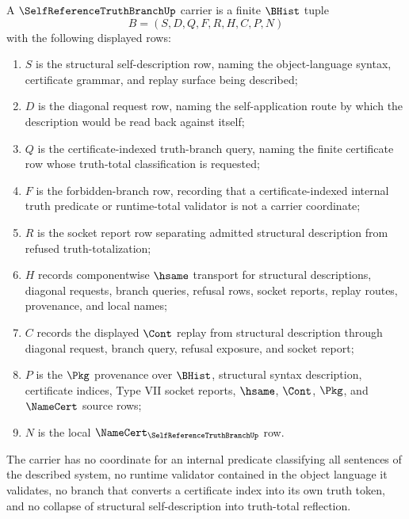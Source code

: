 \begin{definition}
\label{def:self-reference-truth-branch-carrier}
A $\SelfReferenceTruthBranchUp$ carrier is a finite $\BHist$ tuple
$$
B=(S,D,Q,F,R,H,C,P,N)
$$
with the following displayed rows:
\begin{enumerate}
\item $S$ is the structural self-description row, naming the object-language syntax, certificate grammar, and replay surface being described;
\item $D$ is the diagonal request row, naming the self-application route by which the description would be read back against itself;
\item $Q$ is the certificate-indexed truth-branch query, naming the finite certificate row whose truth-total classification is requested;
\item $F$ is the forbidden-branch row, recording that a certificate-indexed internal truth predicate or runtime-total validator is not a carrier coordinate;
\item $R$ is the socket report row separating admitted structural description from refused truth-totalization;
\item $H$ records componentwise $\hsame$ transport for structural descriptions, diagonal requests, branch queries, refusal rows, socket reports, replay routes, provenance, and local names;
\item $C$ records the displayed $\Cont$ replay from structural description through diagonal request, branch query, refusal exposure, and socket report;
\item $P$ is the $\Pkg$ provenance over $\BHist$, structural syntax description, certificate indices, Type VII socket reports, $\hsame$, $\Cont$, $\Pkg$, and $\NameCert$ source rows;
\item $N$ is the local $\NameCert_{\SelfReferenceTruthBranchUp}$ row.
\end{enumerate}
The carrier has no coordinate for an internal predicate classifying all sentences of the described system, no runtime validator contained in the object language it validates, no branch that converts a certificate index into its own truth token, and no collapse of structural self-description into truth-total reflection.
\end{definition}

